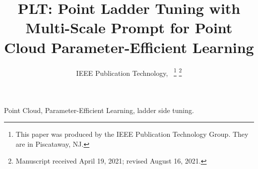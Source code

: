 \documentclass[lettersize,journal]{IEEEtran}
\begin{document}
\title{PLT: Point Ladder Tuning with Multi-Scale Prompt for Point Cloud
Parameter-Efficient Learning}

\author{IEEE Publication Technology,~
\thanks{This paper was produced by the IEEE Publication Technology Group. They are in Piscataway, NJ.}%
\thanks{Manuscript received April 19, 2021; revised August 16, 2021.}}




\maketitle



\begin{IEEEkeywords}
Point Cloud, Parameter-Efficient Learning, ladder side tuning.
\end{IEEEkeywords}











\end{document}
